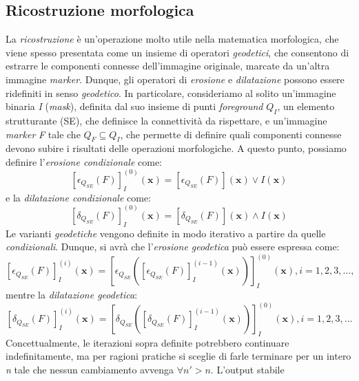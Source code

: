 \subsection{Ricostruzione morfologica}
\label{subsec:math-morph-reconstruction}
La \textit{ricostruzione} \`e un'operazione molto utile nella matematica morfologica, che viene spesso presentata come un insieme di operatori \textit{geodetici}, che consentono di estrarre le componenti connesse dell'immagine originale, marcate da un'altra immagine \textit{marker}. Dunque, gli operatori di \textit{erosione} e \textit{dilatazione} possono essere ridefiniti in senso \textit{geodetico}. In particolare, consideriamo al solito un'immagine binaria \textit{I} (\textit{mask}), definita dal suo insieme di punti \textit{foreground} $Q_{I}$, un elemento strutturante (SE), che definisce la connettivit\`a da rispettare, e un'immagine \textit{marker} \textit{F} tale che $Q_{F} \subseteq Q_{I}$, che permette di definire quali componenti connesse devono subire i risultati delle operazioni morfologiche. A questo punto, possiamo definire l'\textit{erosione condizionale} come:
\begin{equation}
	\label{eq:conditional-erosion}
	[\epsilon_{Q_{SE}}(F)]^{(0)}_{I}(\textbf{x}) = [\epsilon_{Q_{SE}}(F)](\textbf{x}) \vee I(\textbf{x})
\end{equation}
e la \textit{dilatazione condizionale} come:
\begin{equation}
	\label{eq:conditional-dilation}
	[\delta_{Q_{SE}}(F)]^{(0)}_{I}(\textbf{x}) = [\delta_{Q_{SE}}(F)](\textbf{x}) \wedge I(\textbf{x})
\end{equation}
Le varianti \textit{geodetiche} vengono definite in modo iterativo a partire da quelle \textit{condizionali}. Dunque, si avr\`a che l'\textit{erosione geodetica} pu\`o essere espressa come:
\begin{equation}
	\label{eq:geodesic-erosion}
	[\epsilon_{Q_{SE}}(F)]^{(i)}_{I}(\textbf{x}) = [\epsilon_{Q_{SE}}([\epsilon_{Q_{SE}}(F)]^{(i-1)}_{I}(\textbf{x}))]^{(0)}_{I}(\textbf{x}), i=1,2,3,\dots,
\end{equation}
mentre la \textit{dilatazione geodetica}:
\begin{equation}
	\label{eq:geodesic-dilation}
	[\delta_{Q_{SE}}(F)]^{(i)}_{I}(\textbf{x}) = [\delta_{Q_{SE}}([\delta_{Q_{SE}}(F)]^{(i-1)}_{I}(\textbf{x}))]^{(0)}_{I}(\textbf{x}), i=1,2,3,\dots
\end{equation}
Concettualmente, le iterazioni sopra definite potrebbero continuare indefinitamente, ma per ragioni pratiche si sceglie di farle terminare per un intero \textit{n} tale che nessun cambiamento avvenga $\forall n' > n$. L'output stabile 
